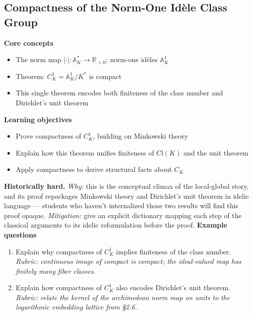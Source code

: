 \documentclass[11pt]{article}
\newcommand{\A}{\mathbb{A}}
\begin{document}
\subsection{Compactness of the Norm-One Idèle Class Group}
\textbf{Core concepts}
\begin{itemize}[noitemsep]
  \item The norm map $|\cdot|: \A_K^* \to \mathbb{R}_{>0}$; norm-one idèles $\A_K^1$
  \item Theorem: $C_K^1 = \A_K^1/K^*$ is compact
  \item This single theorem encodes both finiteness of the class number and Dirichlet's unit theorem
\end{itemize}
\textbf{Learning objectives}
\begin{itemize}[noitemsep]
  \item Prove compactness of $C_K^1$, building on Minkowski theory
  \item Explain how this theorem unifies finiteness of $\mathrm{Cl}(K)$ and the unit theorem
  \item Apply compactness to derive structural facts about $C_K$
\end{itemize}
\textbf{Historically hard.} \emph{Why:} this is the conceptual climax of the local-global story, and its proof repackages Minkowski theory and Dirichlet's unit theorem in idelic language --- students who haven't internalized those two results will find this proof opaque. \emph{Mitigation:} give an explicit dictionary mapping each step of the classical arguments to its idelic reformulation before the proof.
\textbf{Example questions}
\begin{enumerate}[noitemsep]
  \item[Q1 (foundational).] Explain why compactness of $C_K^1$ implies finiteness of the class number. \emph{Rubric: continuous image of compact is compact; the ideal-valued map has finitely many fiber classes.}
  \item[Q2 (advanced).] Explain how compactness of $C_K^1$ also encodes Dirichlet's unit theorem. \emph{Rubric: relate the kernel of the archimedean norm map on units to the logarithmic embedding lattice from \S2.6.}
\end{enumerate}

\end{document}
